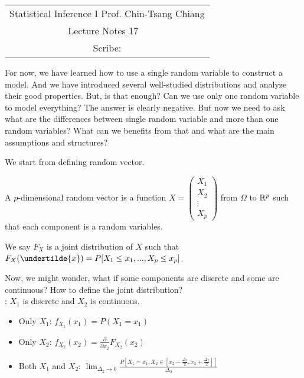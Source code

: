 \documentclass[../MultivariateProbabilityAndRelatedProperties.tex]{subfiles}
\begin{document}
	\begin{center}
		\renewcommand{\arraystretch}{2}
		\begin{bfseries}
			\begin{tabular}{|c|}
				\hline
				Statistical Inference I \hfill Prof. Chin-Tsang Chiang\\
				\hspace{15em} {\large Lecture Notes 17} \hspace{15em}\ \\
				\lecdate \hfill Scribe: \scribe\\
				\hline
			\end{tabular}
			\renewcommand{\arraystretch}{1}
		\end{bfseries}
	\end{center}

For now, we have learned how to use a single random variable to construct a model. And we have introduced several well-studied distributions and analyze their good properties. But, is that enough? Can we use only one random variable to model everything? The answer is clearly negative. But now we need to ask what are the differences between single random variable and more than one random variables? What can we benefits from that and what are the main assumptions and structures?

We start from defining random vector.
\begin{definition}
	A $p$-dimensional random vector is a function $X = \left(\begin{array}{c}
	X_1\\
	X_2\\
	\vdots\\
	X_p
	\end{array}\right)$ from $\Omega$ to ${\mathbb R}^p$ such that each component is a random variables.
\end{definition}
\begin{definition}
	We say $F_X$ is a joint distribution of $X$ such that $F_X(\undertilde{x}) = P[X_1\leq x_1,...,X_p\leq x_p]$.
\end{definition}

Now, we might wonder, what if some components are discrete and some are continuous? How to define the joint distribution?\\

: $X_1$ is discrete and $X_2$ is continuous.
\begin{itemize}
	\item Only $X_1$: $f_{X_1}(x_1) = P(X_1=x_1)$
	\item Only $X_2$: $f_{X_2}(x_2) = \frac{\partial}{\partial x_2}F_{X_2}(x_2)$
	\item Both $X_1$ and $X_2$: $\lim_{\Delta_2\rightarrow0}\frac{P[X_1=x_1,X_2\in[x_2-\frac{\Delta_2}{2},x_2+\frac{\Delta_2}{2}]]}{\Delta_2}$
\end{itemize}
\end{document}
